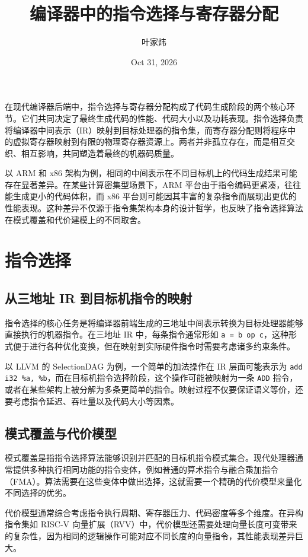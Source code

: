 \title{编译器中的指令选择与寄存器分配}
\author{叶家炜}
\date{Oct 31, 2026}
\maketitle
在现代编译器后端中，指令选择与寄存器分配构成了代码生成阶段的两个核心环节。它们共同决定了最终生成代码的性能、代码大小以及功耗表现。指令选择负责将编译器中间表示（IR）映射到目标处理器的指令集，而寄存器分配则将程序中的虚拟寄存器映射到有限的物理寄存器资源上。两者并非孤立存在，而是相互交织、相互影响，共同塑造着最终的机器码质量。\par
以 ARM 和 x86 架构为例，相同的中间表示在不同目标机上的代码生成结果可能存在显著差异。在某些计算密集型场景下，ARM 平台由于指令编码更紧凑，往往能生成更小的代码体积，而 x86 平台则可能因其丰富的复杂指令而展现出更优的性能表现。这种差异不仅源于指令集架构本身的设计哲学，也反映了指令选择算法在模式覆盖和代价建模上的不同取舍。\par
\chapter{指令选择}
\section{从三地址 IR 到目标机指令的映射}
指令选择的核心任务是将编译器前端生成的三地址中间表示转换为目标处理器能够直接执行的机器指令。在三地址 IR 中，每条指令通常形如 \texttt{a = b op c}，这种形式便于进行各种优化变换，但在映射到实际硬件指令时需要考虑诸多约束条件。\par
以 LLVM 的 SelectionDAG 为例，一个简单的加法操作在 IR 层面可能表示为 \texttt{add i32 \%{}a, \%{}b}，而在目标机指令选择阶段，这个操作可能被映射为一条 \texttt{ADD} 指令，或者在某些架构上被分解为多条更简单的指令。映射过程不仅要保证语义等价，还要考虑指令延迟、吞吐量以及代码大小等因素。\par
\section{模式覆盖与代价模型}
模式覆盖是指指令选择算法能够识别并匹配的目标机指令模式集合。现代处理器通常提供多种执行相同功能的指令变体，例如普通的算术指令与融合乘加指令（FMA）。算法需要在这些变体中做出选择，这就需要一个精确的代价模型来量化不同选择的优劣。\par
代价模型通常综合考虑指令执行周期、寄存器压力、代码密度等多个维度。在异构指令集如 RISC-V 向量扩展（RVV）中，代价模型还需要处理向量长度可变带来的复杂性，因为相同的逻辑操作可能对应不同长度的向量指令，其性能表现差异巨大。\par
